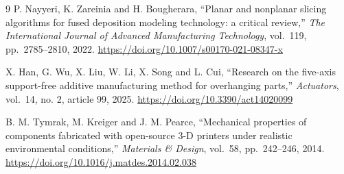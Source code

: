\documentclass[12pt,a4paper]{article}
\begin{document}
\begin{thebibliography}{9}
 P. Nayyeri, K. Zareinia and H. Bougherara, ``Planar and nonplanar slicing
  algorithms for fused deposition modeling technology: a critical review,'' \emph{The International
  Journal of Advanced Manufacturing Technology}, vol.~119, pp.~2785--2810, 2022.
  \url{https://doi.org/10.1007/s00170-021-08347-x}

 X. Han, G. Wu, X. Liu, W. Li, X. Song and L. Cui, ``Research on the five-axis
  support-free additive manufacturing method for overhanging parts,'' \emph{Actuators}, vol.~14, no. 2,
  article 99, 2025. \url{https://doi.org/10.3390/act14020099}

 B. M. Tymrak, M. Kreiger and J. M. Pearce, ``Mechanical properties of components
  fabricated with open-source 3-D printers under realistic environmental conditions,'' \emph{Materials \&
  Design}, vol.~58, pp.~242--246, 2014. \url{https://doi.org/10.1016/j.matdes.2014.02.038}
\end{thebibliography}

\end{document}
